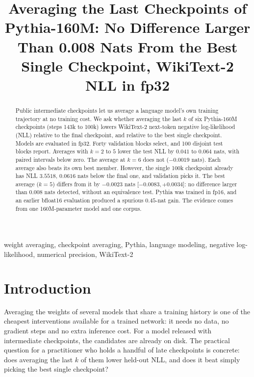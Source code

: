 \documentclass[conference]{IEEEtran}
\begin{document}
\title{Averaging the Last Checkpoints of Pythia-160M: No Difference Larger Than 0.008 Nats From the Best Single Checkpoint, WikiText-2 NLL in fp32}

\author{
}

\maketitle

\begin{abstract}
Public intermediate checkpoints let us average a language model's own training trajectory at no training cost. We ask whether averaging the last $k$ of six Pythia-160M checkpoints (steps 143k to 100k) lowers WikiText-2 next-token negative log-likelihood (NLL) relative to the final checkpoint, and relative to the best single checkpoint. Models are evaluated in fp32. Forty validation blocks select, and 100 disjoint test blocks report. Averages with $k=2$ to $5$ lower the test NLL by $0.041$ to $0.064$ nats, with paired intervals below zero. The average at $k=6$ does not ($-0.0019$ nats). Each average also beats its own best member. However, the single 100k checkpoint already has NLL $3.5518$, $0.0616$ nats below the final one, and validation picks it. The best average ($k=5$) differs from it by $-0.0023$ nats [$-0.0083,+0.0034$]: no difference larger than $0.008$ nats detected, without an equivalence test. Pythia was trained in fp16, and an earlier bfloat16 evaluation produced a spurious $0.45$-nat gain. The evidence comes from one 160M-parameter model and one corpus.
\end{abstract}

\begin{IEEEkeywords}
weight averaging, checkpoint averaging, Pythia, language modeling, negative log-likelihood, numerical precision, WikiText-2
\end{IEEEkeywords}

\section{Introduction}
Averaging the weights of several models that share a training history is one of the cheapest interventions available for a trained network: it needs no data, no gradient steps and no extra inference cost. For a model released with intermediate checkpoints, the candidates are already on disk. The practical question for a practitioner who holds a handful of late checkpoints is concrete: does averaging the last $k$ of them lower held-out NLL, and does it beat simply picking the best single checkpoint?
\end{document}
